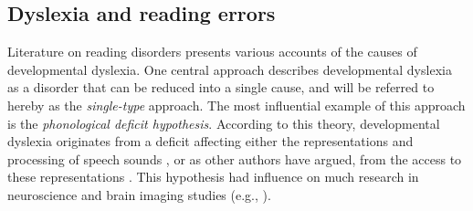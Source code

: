 \subsection{Dyslexia and reading errors}
Literature on reading disorders presents various accounts of the causes of developmental dyslexia. One central approach describes developmental dyslexia as a disorder that can be reduced into a single cause, and will be referred to hereby as the {\it single-type} approach. The most influential example of this approach is the {\it phonological deficit hypothesis}. According to this theory, developmental dyslexia originates from a deficit affecting either the representations and processing of speech sounds \citep{ss05, s00, s98}, or as other authors have argued, from the access to these representations \citep{rs08}. This hypothesis had influence on much research in neuroscience and brain imaging studies (e.g., \citealp{bdvsgmg13, d09, vgpsh13, grggvfb02, r14, rrddcw03}).

